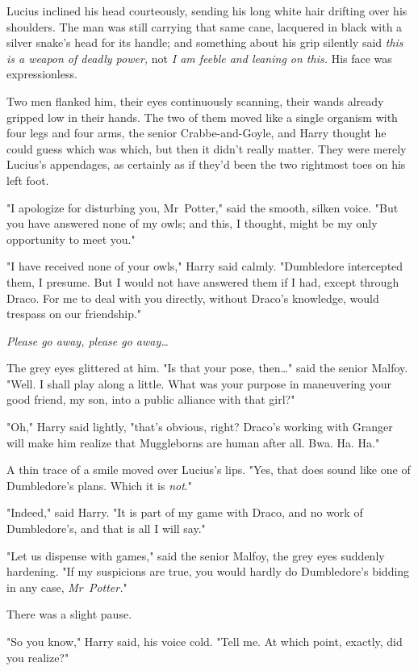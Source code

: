 Lucius inclined his head courteously, sending his long white hair drifting over
his shoulders. The man was still carrying that same cane, lacquered in black
with a silver snake’s head for its handle; and something about his grip
silently said \emph{this is a weapon of deadly power,} not \emph{I am feeble
and leaning on this.} His face was expressionless.

Two men flanked him, their eyes continuously scanning, their wands already
gripped low in their hands. The two of them moved like a single organism with
four legs and four arms, the senior Crabbe-and-Goyle, and Harry thought he
could guess which was which, but then it didn’t really matter. They were merely
Lucius’s appendages, as certainly as if they’d been the two rightmost toes on
his left foot.

"I apologize for disturbing you, Mr~Potter," said the smooth, silken voice.
"But you have answered none of my owls; and this, I thought, might be my only
opportunity to meet you."

"I have received none of your owls," Harry said calmly. "Dumbledore intercepted
them, I presume. But I would not have answered them if I had, except through
Draco. For me to deal with you directly, without Draco’s knowledge, would
trespass on our friendship."

\emph{Please go away, please go away…}

The grey eyes glittered at him. "Is that your pose, then…" said the
senior Malfoy. "Well. I shall play along a little. What was your purpose in
maneuvering your good friend, my son, into a public alliance with that girl?"

"Oh," Harry said lightly, "that’s obvious, right? Draco’s working with Granger
will make him realize that Muggleborns are human after all. Bwa. Ha. Ha."

A thin trace of a smile moved over Lucius’s lips. "Yes, that does sound like
one of Dumbledore’s plans. Which it is \emph{not}."

"Indeed," said Harry. "It is part of my game with Draco, and no work of
Dumbledore’s, and that is all I will say."

"Let us dispense with games," said the senior Malfoy, the grey eyes suddenly
hardening. "If my suspicions are true, you would hardly do Dumbledore’s bidding
in any case, \emph{Mr~Potter.}"

There was a slight pause.

"So you know," Harry said, his voice cold. "Tell me. At which point, exactly,
did you realize?"

